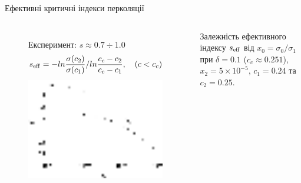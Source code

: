 \documentclass[10pt]{beamer}
\begin{document}
\begin{frame}{Ефективні критичні індекси перколяції}
\begin{columns}[T,onlytextwidth]
      \begin{figure}
        \centering
        Експеримент: $s\approx 0.7 \div 1.0$
        $$s_{\rm eff} = - ln \frac{\sigma(c_2)}{\sigma(c_1)} / ln \frac{c_c-c_2}{c_c - c_1}, \quad (c<c_c)$$
        \includegraphics[width=0.99\textwidth]{images/seff.eps}
      \end{figure}
      \hfill
      \begin{minipage}[t]{0.9\textwidth}
        Залежність ефективного індексу $s_{\rm eff}$ від $x_0 = \sigma_0/\sigma_1$ при  $\delta=0.1$ ($c_c \approx 0.251$), $x_2 = 5\times 10^{-5}$, $c_1 = 0.24$ та $c_2 = 0.25$.\\
      \end{minipage}
\end{columns}

\end{frame}
\end{document}
